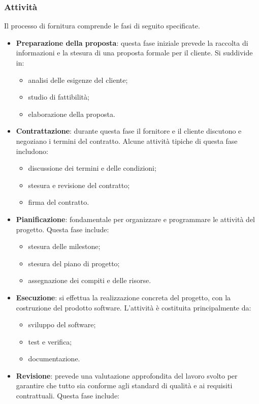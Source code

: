 \subsubsection{Attività}
Il processo di fornitura comprende le fasi di seguito specificate.
\begin{itemize}
	\item \textbf{Preparazione della proposta}: questa fase iniziale prevede la raccolta di informazioni e la stesura di una proposta formale per il cliente. Si suddivide in:
		\begin{itemize}
			\item analisi delle esigenze del cliente;
			\item studio di fattibilità;
			\item elaborazione della proposta.
		\end{itemize}
	\item \textbf{Contrattazione}: durante questa fase il fornitore e il cliente discutono e negoziano i termini del contratto. Alcune attività tipiche di questa fase includono:
		\begin{itemize}
			\item discussione dei termini e delle condizioni;
			\item stesura e revisione del contratto;
			\item firma del contratto.
		\end{itemize}
	\item \textbf{Pianificazione}: fondamentale per organizzare e programmare le attività del progetto. Questa fase include:
		\begin{itemize}
			\item stesura delle milestone;
			\item stesura del piano di progetto;
			\item assegnazione dei compiti e delle risorse.
		\end{itemize}
	\item \textbf{Esecuzione}: si effettua la realizzazione concreta del progetto, con la costruzione del prodotto software. L'attività è costituita principalmente da:
		\begin{itemize}
			\item sviluppo del software;
			\item test e verifica;
			\item documentazione.
		\end{itemize}
	\item \textbf{Revisione}: prevede una valutazione approfondita del lavoro svolto per garantire che tutto sia conforme agli standard di qualità e ai requisiti contrattuali. Questa fase include:

\end{itemize}
